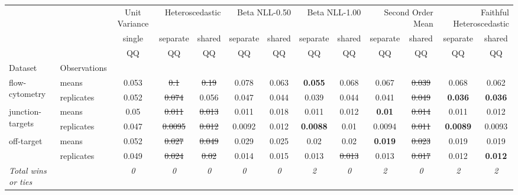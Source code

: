 \begin{tabular}{ll|c|cc|cc|cc|cc|cc}
\toprule
{} & {} & {Unit Variance} & \multicolumn{2}{r}{Heteroscedastic} & \multicolumn{2}{r}{Beta NLL-0.50} & \multicolumn{2}{r}{Beta NLL-1.00} & \multicolumn{2}{r}{Second Order Mean} & \multicolumn{2}{r}{Faithful Heteroscedastic} \\
{} & {} & {single} & {separate} & {shared} & {separate} & {shared} & {separate} & {shared} & {separate} & {shared} & {separate} & {shared} \\
{} & {} & {QQ} & {QQ} & {QQ} & {QQ} & {QQ} & {QQ} & {QQ} & {QQ} & {QQ} & {QQ} & {QQ} \\
{Dataset} & {Observations} & {} & {} & {} & {} & {} & {} & {} & {} & {} & {} & {} \\
\midrule
\multirow[t]{2}{*}{flow-cytometry} & means & 0.053 & \sout{0.1} & \sout{0.19} & 0.078 & 0.063 & \textbf{0.055} & 0.068 & 0.067 & \sout{0.039} & 0.068 & 0.062 \\
 & replicates & 0.052 & \sout{0.074} & 0.056 & 0.047 & 0.044 & 0.039 & 0.044 & 0.041 & \sout{0.049} & \textbf{0.036} & \textbf{0.036} \\
\multirow[t]{2}{*}{junction-targets} & means & 0.05 & \sout{0.011} & \sout{0.013} & 0.011 & 0.018 & 0.011 & 0.012 & \textbf{0.01} & \sout{0.014} & 0.011 & 0.012 \\
 & replicates & 0.047 & \sout{0.0095} & \sout{0.012} & 0.0092 & 0.012 & \textbf{0.0088} & 0.01 & 0.0094 & \sout{0.011} & \textbf{0.0089} & 0.0093 \\
\multirow[t]{2}{*}{off-target} & means & 0.052 & \sout{0.027} & \sout{0.049} & 0.029 & 0.025 & 0.02 & 0.02 & \textbf{0.019} & \sout{0.023} & 0.019 & 0.019 \\
 & replicates & 0.049 & \sout{0.024} & \sout{0.02} & 0.014 & 0.015 & 0.013 & \sout{0.013} & 0.013 & \sout{0.017} & 0.012 & \textbf{0.012} \\
\textit{{Total wins or ties}} &  & \textit{0} & \textit{0} & \textit{0} & \textit{0} & \textit{0} & \textit{2} & \textit{0} & \textit{2} & \textit{0} & \textit{2} & \textit{2} \\
\bottomrule
\end{tabular}
